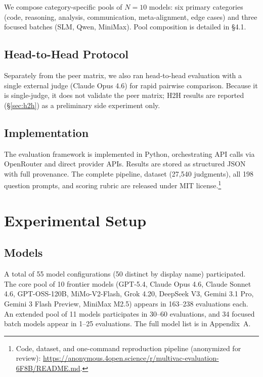 \documentclass{article}
\begin{document}
We compose category-specific pools of $N = 10$ models: six primary categories (code, reasoning, analysis, communication, meta-alignment, edge cases) and three focused batches (SLM, Qwen, MiniMax). Pool composition is detailed in \S4.1.

\subsection{Head-to-Head Protocol}

Separately from the peer matrix, we also ran head-to-head evaluation with a single external judge (Claude Opus 4.6) for rapid pairwise comparison. Because it is single-judge, it does not validate the peer matrix; H2H results are reported (\S\ref{sec:h2h}) as a preliminary side experiment only.

\subsection{Implementation}

The evaluation framework is implemented in Python, orchestrating API calls via OpenRouter and direct provider APIs. Results are stored as structured JSON with full provenance. The complete pipeline, dataset (27,540 judgments), all 198 question prompts, and scoring rubric are released under MIT license.\footnote{Code, dataset, and one-command reproduction pipeline (anonymized for review): \url{https://anonymous.4open.science/r/multivac-evaluation-6F8B/README.md}.}


\section{Experimental Setup}

\subsection{Models}

A total of 55 model configurations (50 distinct by display name) participated. The core pool of 10 frontier models (GPT-5.4, Claude Opus 4.6, Claude Sonnet 4.6, GPT-OSS-120B, MiMo-V2-Flash, Grok 4.20, DeepSeek V3, Gemini 3.1 Pro, Gemini 3 Flash Preview, MiniMax M2.5) appears in 163--238 evaluations each. An extended pool of 11 models participates in 30--60 evaluations, and 34 focused batch models appear in 1--25 evaluations. The full model list is in Appendix~A.
\end{document}
